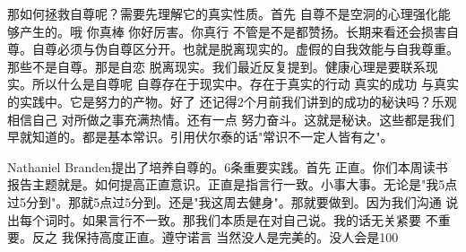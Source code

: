 那如何拯救自尊呢？需要先理解它的真实性质。首先 自尊不是空洞的心理强化能够产生的。哦 你真棒 你好厉害。你真行 不管是不是都赞扬。长期来看还会损害自尊。自尊必须与伪自尊区分开。也就是脱离现实的。虚假的自我效能与自我尊重。那些不是自尊。那是自恋 脱离现实。我们最近反复提到。健康心理是要联系现实。所以什么是自尊呢 自尊存在于现实中。存在于真实的行动 真实的成功 与真实的实践中。它是努力的产物。好了 还记得2个月前我们讲到的成功的秘诀吗？乐观 相信自己 对所做之事充满热情。还有一点 努力奋斗。这就是秘诀。这些都是我们早就知道的。都是基本常识。引用伏尔泰的话"常识不一定人皆有之"。 

Nathaniel Branden提出了培养自尊的。6条重要实践。首先 正直。你们本周读书报告主题就是。如何提高正直意识。正直是指言行一致。小事大事。无论是"我5点过5分到"。那就5点过5分到。还是"我这周去健身"。那就要做到。因为我们沟通 说出每个词时。如果言行不一致。那我们本质是在对自己说。我的话无关紧要 不重要。反之 我保持高度正直。遵守诺言 当然没人是完美的。没人会是100%